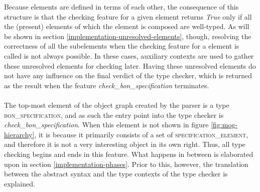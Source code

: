 Because \bon{} elements are defined in terms of each other, the consequence of this structure is that the checking feature for a given \bon{} element returns \textit{True} only if all the (present) elements of which the element is composed are well-typed. As will be shown in section \ref{implementation-unresolved-elements}, though, resolving the correctness of all the subelements when the checking feature for a \bon{} element is called is not always possible. In these cases, auxiliary contexts are used to gather these unresolved \bon{} elements for checking later. Having these unresolved elements do not have any influence on the final verdict of the type checker, which is returned as the result when the feature \textit{check\_bon\_specification} terminates.
\paragraph{}
The top-most element of the object graph created by the parser is a type \textsc{bon\_specification}, and as such the entry point into the type checker is \textit{check\_bon\_specification}. When this element is not shown in figure \ref{fig:mog-hierarchy}, it is because it primarily consists of a set of \textsc{specification\_element}, and therefore it is not a very interesting object in its own right. Thus, all type checking begins and ends in this feature. What happens in between is elaborated upon in section \ref{implementation-phases}. Prior to this, however, the translation between the abstract syntax and the type contexts of the type checker is explained.

